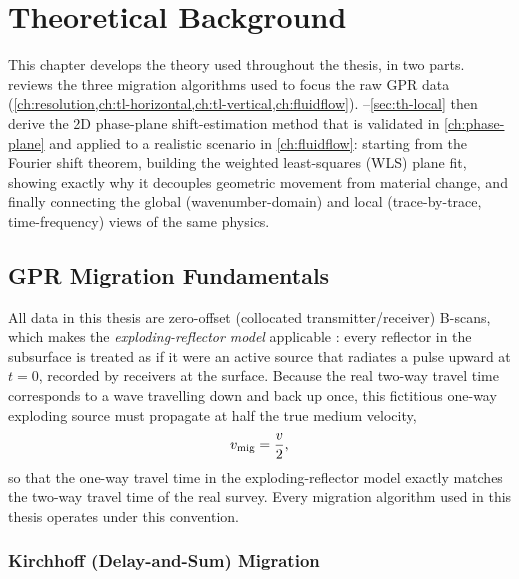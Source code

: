 \chapter{Theoretical Background}
\label{ch:theory}

This chapter develops the theory used throughout the thesis, in two parts.
 reviews the three migration algorithms used to focus
the raw GPR data (\cref{ch:resolution,ch:tl-horizontal,ch:tl-vertical,ch:fluidflow}).
--\ref{sec:th-local} then derive the 2D phase-plane
shift-estimation method that is validated in \cref{ch:phase-plane} and applied
to a realistic scenario in \cref{ch:fluidflow}: starting from the Fourier shift
theorem, building the weighted least-squares (WLS) plane fit, showing exactly
why it decouples geometric movement from material change, and finally
connecting the global (wavenumber-domain) and local (trace-by-trace,
time-frequency) views of the same physics.

\section{GPR Migration Fundamentals}
\label{sec:th-migration}

All data in this thesis are zero-offset (collocated transmitter/receiver)
B-scans, which makes the \emph{exploding-reflector model} applicable
\citep{claerbout1985}: every reflector in the subsurface is treated as if it
were an active source that radiates a pulse upward at $t=0$, recorded by
receivers at the surface. Because the real two-way travel time corresponds to
a wave travelling down and back up once, this fictitious one-way exploding
source must propagate at half the true medium velocity,
\begin{equation}
  v_{\mathrm{mig}} = \frac{v}{2},
  \label{eq:vmig}
\end{equation}
so that the one-way travel time in the exploding-reflector model exactly
matches the two-way travel time of the real survey. Every migration algorithm
used in this thesis operates under this convention.

\subsection{Kirchhoff (Delay-and-Sum) Migration}

